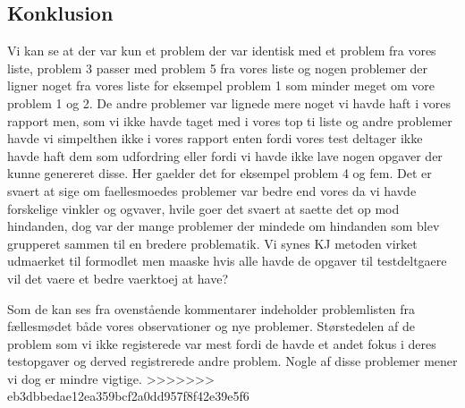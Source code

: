\documentclass[12pt]{article}
\begin{document}
\subsection*{Konklusion}

Vi kan se at der var kun et problem der var identisk med et problem fra vores liste, problem 3 passer med problem 5 fra vores liste og nogen problemer der ligner noget fra vores liste for eksempel problem 1 som minder meget om vore problem 1 og 2. De andre problemer var lignede mere noget vi havde haft i vores rapport men, som vi ikke havde taget med i vores top ti liste og andre problemer havde vi simpelthen ikke i vores rapport enten fordi vores test deltager ikke havde haft dem som udfordring eller fordi vi havde ikke lave nogen opgaver der kunne genereret disse. Her gaelder det for eksempel problem 4 og fem. 
Det er svaert at sige om faellesmoedes problemer var bedre end vores da vi havde forskelige vinkler og ogvaver, hvile goer det svaert at saette det op mod hindanden, dog var der mange problemer der mindede om hindanden som blev grupperet sammen til en bredere problematik. Vi synes KJ metoden virket udmaerket til formodlet men maaske hvis alle havde de opgaver til testdeltgaere vil det vaere et bedre vaerktoej at have?

Som de kan ses fra ovenstående kommentarer indeholder problemlisten fra fællesmødet både vores observationer og nye problemer. Størstedelen af de problem som vi ikke registerede var mest fordi de havde et andet fokus i deres testopgaver og derved registrerede andre problem. Nogle af disse problemer mener vi dog er mindre vigtige.
>>>>>>> eb3dbbedae12ea359bcf2a0dd957f8f42e39e5f6
\end{document}
